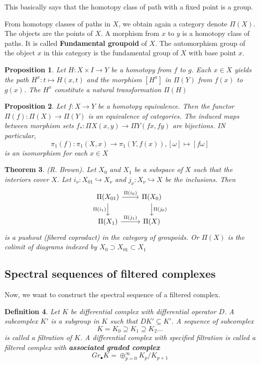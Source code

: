 \documentclass[11pt]{article}
\newtheorem{thm}{Theorem}[section]
\newtheorem{prop}[thm]{Proposition}
\newtheorem{dfn}[thm]{Definition}
\newcommand{\lrta}{\longrightarrow}
\newcommand{\inj}{\hookrightarrow}
\begin{document}
This basically says that the homotopy class of path with a fixed point is a group.

From homotopy classes of paths in $X$, we obtain again a category denote $\Pi(X)$. The objects are the points of $X$. A morphism from $x$ to $y$ is a homotopy class of paths. It is called \textbf{Fundamental groupoid} of $X$. The automorphism group of the object $x$ in this category is the fundamental group of $X$ with base point $x$.

\begin{prop}
Let $H : X  \times I \lrta Y$ be a homotopy from $f$ to $g$. Each $x \in X$ yields the path $H^x:t\mapsto H(x,t)$ and the morphism $[H^x]$ in $\Pi(Y)$ from $f(x)$ to $g(x)$. The $H^x$ constitute a natural transformation $\Pi(H)$
\end{prop}
\begin{prop}
 Let $f : X \lrta Y$ be a homotopy equivalence. Then the functor $\Pi(f):\Pi(X)\lrta \Pi(Y)$ is an equivalence of categories. The induced maps between morphism sets $f_*:\Pi X(x,y)\lrta \Pi Y(fx,fy)$ are bijections. IN particular,
 $$
 \pi_1(f):\pi_1(X,x)\lrta \pi_1(Y,f(x)), [\omega]\mapsto [f\omega]
 $$
 is an isomorphism for each $x\in X$
\end{prop}

\begin{thm}
(R. Brown). Let $X_0$ and $X_1$ be a subspace of $X$ such that the interiors cover $X$. Let $i_\nu:X_{01}\inj X_\nu$ and $j_\nu:X_\nu\inj X$ be the inclusions. Then 
\[
\begin{tikzcd}
\Pi(X_{01}) \arrow[r, "\Pi(i_0)"] \arrow[d, "\Pi(i_1)"'] & \Pi(X_0) \arrow[d, "\Pi(j_0)"] \\
\Pi(X_1) \arrow[r, "\Pi(j_1)"] & \Pi(X)
\end{tikzcd}
\]
 is a pushout (fibered coproduct) in the category of groupoids. Or $\Pi(X)$  is the colimit of diagrams indexed by $X_0\supset X_{01}\subset X_1$
 \end{thm}


\subsection{Spectral sequences of filtered complexes}
Now, we want to construct the spectral sequence of a filtered complex.
\begin{dfn}
Let $K$ be differential complex with differential operator $D$. A subcomplex $K'$ is a subgroup in $K$ such that $DK'\subseteq K'$. A sequence of subcomplex 
$$K=K_0\supseteq K_1\supseteq K_2...$$
is called a filtration of $K$. A differential complex with specified filtration is called a filtered complex with  
\textbf{associated graded complex}
$$
Gr_{\bullet} K=\oplus^\infty_{p=0} K_p/K_{p+1}
$$
\end{dfn} 
\end{document}
